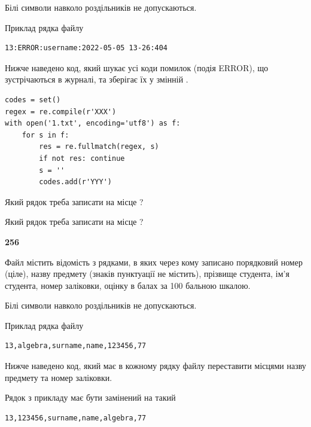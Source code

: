 Білі символи навколо роздільників не допускаються.

Приклад рядка файлу



\begin{verbatim}
13:ERROR:username:2022-05-05 13-26:404
\end{verbatim}


Нижче наведено код, який шукає усі коди помилок (подія ERROR), що зустріча\-ють\-ся в журналі, та зберігає їх у змінній .



\begin{verbatim}
codes = set()
regex = re.compile(r'XXX')
with open('1.txt', encoding='utf8') as f:
    for s in f:
        res = re.fullmatch(regex, s)
        if not res: continue
        s = ''
        codes.add(r'YYY')
\end{verbatim}





Який рядок треба записати на місце  ?\par
\vspace{5mm}


Який рядок треба записати на місце  ?\par


\newpage

{\begin {center}\textbf{ 256}\end {center}}\par
Файл  містить відомість з рядками, в яких через кому записано поряд\-ковий номер (ціле), назву предмету (знаків пунктуації не містить), прізвище студента, ім'я студента, номер заліковки, оцінку в балах за 100 бальною шкалою.

Білі символи навколо роздільників не допускаються.

Приклад рядка файлу



\begin{verbatim}
13,algebra,surname,name,123456,77
\end{verbatim}


Нижче наведено код, який має в кожному рядку файлу переставити місцями назву предмету та номер заліковки.

Рядок з прикладу має бути замінений на такий



\begin{verbatim}
13,123456,surname,name,algebra,77
\end{verbatim}




